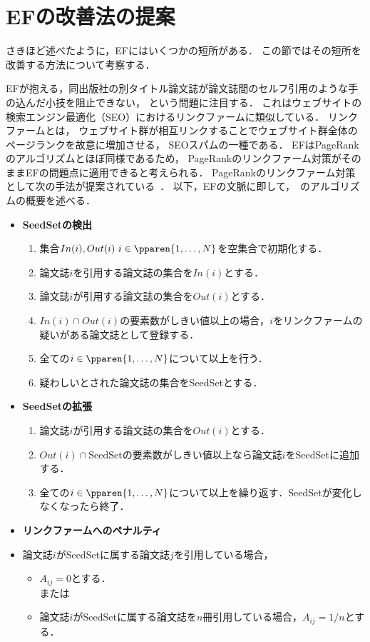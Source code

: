 \section{EFの改善法の提案}
さきほど述べたように，EFにはいくつかの短所がある．
この節ではその短所を改善する方法について考察する．
\par
EFが抱える，同出版社の別タイトル論文誌が論文誌間のセルフ引用のような手の込んだ小技を阻止できない，
という問題に注目する．
これはウェブサイトの検索エンジン最適化（SEO）におけるリンクファームに類似している．
リンクファームとは，
ウェブサイト群が相互リンクすることでウェブサイト群全体のページランクを故意に増加させる，
SEOスパムの一種である．
EFはPageRankのアルゴリズムとほぼ同様であるため，
PageRankのリンクファーム対策がそのままEFの問題点に適用できると考えられる．
PageRankのリンクファーム対策として次の手法が提案されている~\cite{wu2005}．
以下，EFの文脈に即して，~\cite{wu2005}のアルゴリズムの概要を述べる．
\begin{itemize}
    \item \textbf{SeedSetの検出}
          \begin{enumerate}
              \item 集合$In(i), Out(i)~i \in \pparen{1,\ldots,N}$を空集合で初期化する．
              \item 論文誌$i$を引用する論文誌の集合を$In(i)$とする．
              \item 論文誌$i$が引用する論文誌の集合を$Out(i)$とする．
              \item $In(i) \cap Out(i)$の要素数がしきい値以上の場合，$i$をリンクファームの疑いがある論文誌として登録する．
              \item 全ての$i \in \pparen{1,\ldots,N}$について以上を行う．
              \item 疑わしいとされた論文誌の集合をSeedSetとする．
          \end{enumerate}
    \item \textbf{SeedSetの拡張}
          \begin{enumerate}
              \item 論文誌$i$が引用する論文誌の集合を$Out(i)$とする．
              \item $Out(i) \cap \text{SeedSet}$の要素数がしきい値以上なら論文誌$i$をSeedSetに追加する．
              \item 全ての$i \in \pparen{1,\ldots,N}$について以上を繰り返す．SeedSetが変化しなくなったら終了．
          \end{enumerate}
    \item \textbf{リンクファームへのペナルティ}
    \item[] 論文誌$i$がSeedSetに属する論文誌$j$を引用している場合，
        \begin{itemize}
            \item $A_{ij}=0$とする． \\または
            \item 論文誌$i$がSeedSetに属する論文誌を$n$冊引用している場合，$A_{ij}=1/n$とする．
        \end{itemize}
\end{itemize}
